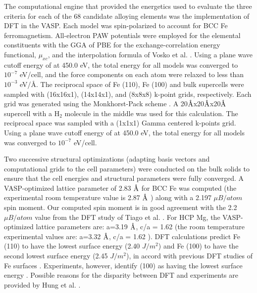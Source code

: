 The computational engine that provided the energetics used to evaluate the three criteria for each of the 68 candidate alloying elements was the implementation of \ac{DFT} in the \ac{VASP}. Each model was spin-polarized to account for \ac{BCC} Fe ferromagnetism. All-electron \ac{PAW} potentials were employed for the elemental constituents with the \ac{GGA} of \ac{PBE} for the exchange-correlation energy functional, $\mu_{xc}$, and the interpolation formula of Vosko et al. \cite{vosko1980accurate}. Using a plane wave cutoff energy of at 450.0 eV, the total energy for all models was converged to $10^{−7}$ eV/cell, and the force components on each atom were relaxed to less than $10^{−3}$ eV/Å. The reciprocal space of Fe (110), Fe (100) and bulk supercells were sampled with (16x16x1), (14x14x1), and (8x8x8) k-point grids, respectively. Each grid was generated using the Monkhorst-Pack scheme \cite{monkhorst1976special}. A 20$\mbox{\normalfont\AA}$x20$\mbox{\normalfont\AA}$x20$\mbox{\normalfont\AA}$ supercell with a $\text{H}_2$ molecule in the middle was used for this calculation. The reciprocal space was sampled with a (1x1x1) Gamma centered k-points grid. Using a plane wave cutoff energy of at 450.0 eV, the total energy for all models was converged to $10^{−7}$ eV/cell.


Two successive structural optimizations (adapting basis vectors and computational grids to the cell parameters) were conducted on the bulk solids to ensure that the cell energies and structural parameters were fully converged. A \ac{VASP}-optimized lattice parameter of 2.83 $\mbox{\normalfont\AA}$ for \ac{BCC} Fe was computed (the experimental room temperature value is 2.87 $\mbox{\normalfont\AA}$ \cite{kohlhaas1967temperature}) along with a 2.197 $\mu B/atom$ spin moment. Our computed spin moment is in good agreement with the 2.2 $\mu B/atom$ value from the \ac{DFT} study of Tiago et al. \cite{tiago2006evolution}. For \ac{HCP} Mg, the VASP-optimized lattice parameters are: a=3.19 $\mbox{\normalfont\AA}$, c/a = 1.62 (the room temperature experimental values are: a=3.32 $\mbox{\normalfont\AA}$, c/a = 1.62 \cite{wrobel2012thermodynamic}). DFT calculations predict Fe (110) to have the lowest surface energy (2.40 $J/m^2$) and Fe (100) to have the second lowest surface energy (2.45 $J/m^2$), in accord with previous DFT studies of Fe surfaces \cite{hung2002first}.  Experiments, however, identify (100) as having the lowest surface energy \cite{tyson1977surface}. Possible reasons for the disparity between DFT and experiments are provided by Hung et al. \cite{hung2002first}.

